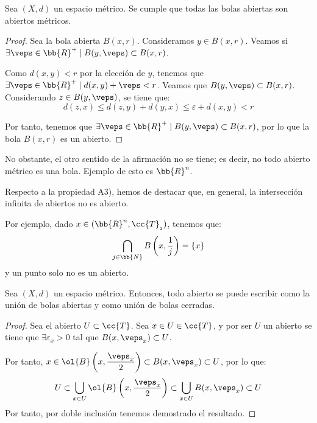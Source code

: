 \begin{prop} Sea $(X,d)$ un espacio métrico. Se cumple que todas las bolas abiertas son abiertos métricos.
\end{prop}
\begin{proof}
    Sea la bola abierta $B(x,r)$. Consideramos $y\in B(x,r)$. Veamos si $\exists \veps \in \bb{R}^+\mid B(y,\veps)\subset B(x,r)$.

    Como $d(x,y)<r$ por la elección de $y$, tenemos que $\exists \veps \in \bb{R}^+\mid d(x,y)+\veps<r$. Veamos que $B(y,\veps)\subset B(x,r)$. Considerando $z\in B(y,\veps)$, se tiene que:
    \begin{equation*}
        d(z,x)\leq d(z,y)+d(y,x)\leq \varepsilon + d(x,y)< r
    \end{equation*}

    Por tanto, tenemos que $\exists \veps \in \bb{R}^+\mid B(y,\veps)\subset B(x,r)$, por lo que la bola $B(x,r)$ es un abierto.
\end{proof}

No obstante, el otro sentido de la afirmación no se tiene; es decir, no todo abierto métrico es una bola. Ejemplo de esto es $\bb{R}^n$.

\begin{observacion}
    Respecto a la propiedad A3), hemos de destacar que, en general, la intersección infinita de abiertos no es abierto.

    Por ejemplo, dado $x\in (\bb{R}^n, \cc{T}_{_2})$, tenemos que:
    \begin{equation*}
        \bigcap_{j\in \bb{N}} B\left(x,\frac{1}{j}\right)=\{x\}
    \end{equation*}
    y un punto solo no es un abierto.
\end{observacion}

\begin{prop}\label{prop:TodoAbiertoUnionBolas}
    Sea $(X,d)$ un espacio métrico. Entonces, todo abierto se puede escribir como la unión de bolas abiertas y como unión de bolas cerradas.
\end{prop}
\begin{proof}
    Sea el abierto $U\subset \cc{T}$. Sea $x\in U\in \cc{T}$, y por ser $U$ un abierto se tiene que $\exists \varepsilon_x>0$ tal que $B(x,\veps_x)\subset U$.

    Por tanto, $\displaystyle x\in \ol{B}\left(x,\frac{\veps_x}{2}\right)\subset B(x,\veps_x)\subset U$, por lo que:
    \begin{equation*}
        U\subset \bigcup_{x\in U}\ol{B}\left(x,\frac{\veps_x}{2}\right) \subset \bigcup_{x\in U} B(x,\veps_x) \subset U
    \end{equation*}
    Por tanto, por doble inclusión tenemos demostrado el resultado.
\end{proof}


